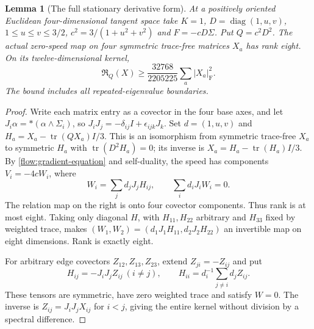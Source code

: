 \documentclass[11pt]{article}
\numberwithin{equation}{section}
\newtheorem{lemma}[theorem]{Lemma}
\theoremstyle{definition}
\theoremstyle{remark}
\begin{document}
\begin{lemma}[The full stationary derivative form]
\label{lem:stationary-spectral-form}
At a positively oriented Euclidean four-dimensional tangent
space take $K=1$, $D=\operatorname{diag}(1,u,v)$,
$1\le u\le v\le3/2$, $c^2=3/(1+u^2+v^2)$ and
$F=-cD\Sigma$. Put $Q=c^2D^2$. The actual zero-speed map on
four symmetric trace-free matrices $X_a$ has rank eight.
On its twelve-dimensional kernel,
\begin{equation}\label{eq:stationary-spectral-coercivity}
 \mathfrak R_Q(X)\ge\frac{32768}{2205225}
                         \sum_a|X_a|_{\mathrm F}^2.
\end{equation}
The bound includes all repeated-eigenvalue boundaries.
\end{lemma}
\begin{proof}
Write each matrix entry as a covector in the four base axes,
and let $J_i\alpha=*(\alpha\wedge\Sigma_i)$, so
$J_iJ_j=-\delta_{ij}I+\epsilon_{ijk}J_k$.
Set $d=(1,u,v)$ and
$H_a=X_a-\operatorname{tr}(QX_a)I/3$.
This is an isomorphism from symmetric trace-free $X_a$ to
symmetric $H_a$ with $\operatorname{tr}(D^2H_a)=0$;
its inverse is $X_a=H_a-\operatorname{tr}(H_a)I/3$.
By \eqref{flow:gradient-equation} and self-duality, the speed
has components $V_i=-4cW_i$, where
\[
 W_i=\sum_jd_jJ_jH_{ij},\qquad \sum_i d_iJ_iW_i=0.
\]
The relation map on the right is onto four covector
components. Thus rank is at most eight. Taking only diagonal
$H$, with $H_{11},H_{22}$ arbitrary and $H_{33}$ fixed by
weighted trace, makes $(W_1,W_2)=(d_1J_1H_{11},d_2J_2H_{22})$
an invertible map on eight dimensions. Rank is exactly eight.

For arbitrary edge covectors $Z_{12},Z_{13},Z_{23}$, extend
$Z_{ji}=-Z_{ij}$ and put
\begin{equation}\label{eq:stationary-edge-kernel}
 H_{ij}=-J_iJ_j Z_{ij}\ (i\ne j),\qquad
 H_{ii}=d_i^{-1}\sum_{j\ne i}d_jZ_{ij}.
\end{equation}
These tensors are symmetric, have zero weighted trace and
satisfy $W=0$. The inverse is $Z_{ij}=J_iJ_jX_{ij}$ for
$i<j$, giving the entire kernel without division by a
spectral difference.


\end{proof}
\end{document}
